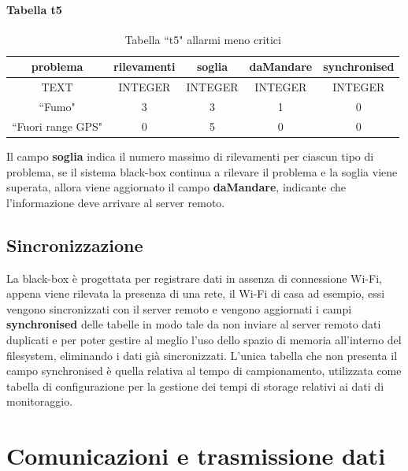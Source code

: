 \documentclass[12pt, a4paper, italian]{report}
\numberwithin{figure}{chapter}
\numberwithin{table}{chapter}
\begin{document}
\paragraph{Tabella t5}
\begin{table}[h!]
  \centering 
  \begin{adjustbox}{max width=\textwidth}
    \begin{tabular}{|c|c|c|c|c|}
      \hline
      \textbf{problema} & \textbf{rilevamenti} & \textbf{soglia} & \textbf{daMandare} & \textbf{synchronised} \\
      \hline
      TEXT & INTEGER & INTEGER & INTEGER & INTEGER \\
      \hline
      ``Fumo" & 3 & 3 & 1 & 0 \\
      \hline
      ``Fuori range GPS" & 0 & 5 & 0 & 0 \\
      \hline
    \end{tabular}
  \end{adjustbox}
  \caption{Tabella ``t5" allarmi meno critici}
  \label{tab:t5 allarmi meno critici}
\end{table}
Il campo \textbf{soglia} indica il numero massimo di rilevamenti per ciascun tipo di problema, se il sistema black-box continua a rilevare il problema e la soglia viene superata, allora viene aggiornato il campo \textbf{daMandare}, indicante che l'informazione deve arrivare al server remoto.

\subsection{Sincronizzazione}
\label{sec:Sincronizzazione}
La black-box è progettata per registrare dati in assenza di connessione Wi-Fi, appena viene rilevata la presenza di una rete, il Wi-Fi di casa ad esempio, essi vengono sincronizzati con il server remoto e vengono aggiornati i campi \textbf{synchronised} delle tabelle in modo tale da non inviare al server remoto dati duplicati e per poter gestire al meglio l'uso dello spazio di memoria all'interno del filesystem, eliminando i dati già sincronizzati. 
L'unica tabella che non presenta il campo synchronised è quella relativa al tempo di campionamento, utilizzata come tabella di configurazione per la gestione dei tempi di storage relativi ai dati di monitoraggio.

\section{Comunicazioni e trasmissione dati}
\end{document}

